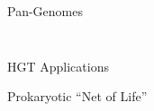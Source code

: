 \documentclass[dvipsnames]{beamer}
\begin{document}
\begin{frame}[fragile]{Pan-Genomes}
\begin{columns}
\begin{column}{0.5\textwidth}
\begin{figure}[htb!]
            \autocite{ecopan}
        \end{figure}
    \end{column}
    \end{columns}
\end{frame}
\begin{frame}[fragile]{HGT Applications}
    \begin{figure}[htb!]
        \autocite{argspread}
    \end{figure}
\end{frame}
\begin{frame}[fragile]{Prokaryotic ``Net of Life''}
    \begin{figure}[htb!]
        \autocite{netoflife}
    \end{figure}
\end{frame}
\end{document}
